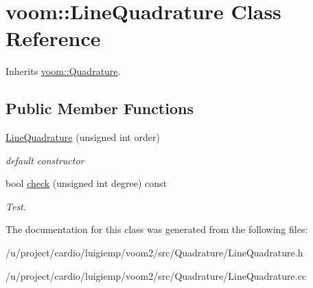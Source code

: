 \hypertarget{classvoom_1_1_line_quadrature}{
\section{voom::LineQuadrature Class Reference}
\label{classvoom_1_1_line_quadrature}
}


Inherits \hyperlink{classvoom_1_1_quadrature}{voom::Quadrature}.\subsection*{Public Member Functions}
\begin{DoxyCompactItemize}
\item 
\hypertarget{classvoom_1_1_line_quadrature_a77e21fa2dd459590a3f2af6126ba6cd0}{
\hyperlink{classvoom_1_1_line_quadrature_a77e21fa2dd459590a3f2af6126ba6cd0}{LineQuadrature} (unsigned int order)}
\label{classvoom_1_1_line_quadrature_a77e21fa2dd459590a3f2af6126ba6cd0}

\begin{DoxyCompactList}\small\item\em default constructor \item\end{DoxyCompactList}\item 
\hypertarget{classvoom_1_1_line_quadrature_a6a9d656053fb790567d825e542060424}{
bool \hyperlink{classvoom_1_1_line_quadrature_a6a9d656053fb790567d825e542060424}{check} (unsigned int degree) const }
\label{classvoom_1_1_line_quadrature_a6a9d656053fb790567d825e542060424}

\begin{DoxyCompactList}\small\item\em Test. \item\end{DoxyCompactList}\end{DoxyCompactItemize}


The documentation for this class was generated from the following files:\begin{DoxyCompactItemize}
\item 
/u/project/cardio/luigiemp/voom2/src/Quadrature/LineQuadrature.h\item 
/u/project/cardio/luigiemp/voom2/src/Quadrature/LineQuadrature.cc\end{DoxyCompactItemize}
